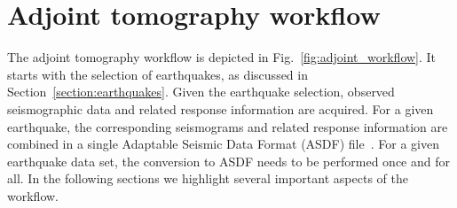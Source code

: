 \documentclass[extra,mreferee]{gji}
\begin{document}




\section{Adjoint tomography workflow}
\label{section:workflow}

The adjoint tomography workflow is depicted in Fig.~\ref{fig:adjoint_workflow}.
It starts with the selection of earthquakes, as discussed in Section~\ref{section:earthquakes}.
Given the earthquake selection,
observed seismographic data and related response information are acquired.
For a given earthquake,
the corresponding seismograms and related response information are combined in a single Adaptable Seismic Data Format (ASDF) file~\citep{krischer2016adaptable}.
For a given earthquake data set, the conversion to ASDF needs to be performed once and for all.
In the following sections we highlight several important aspects of the workflow.
\end{document}
